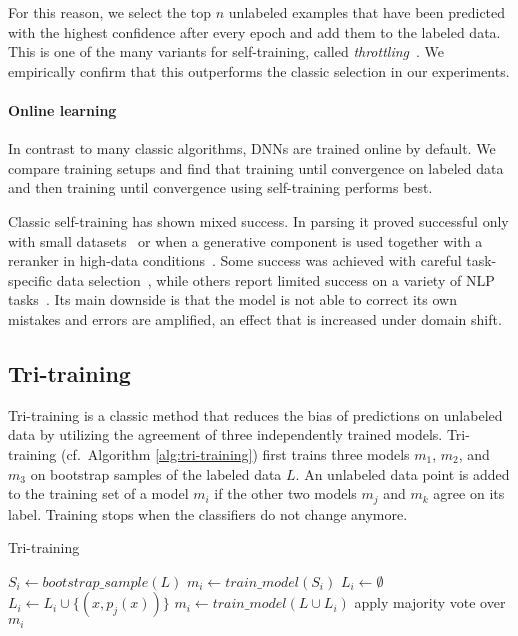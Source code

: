 \documentclass[11pt,a4paper]{article}
\begin{document}
For this reason, we select the top $n$ unlabeled examples that have been predicted with the highest confidence after every epoch and add them to the labeled data. This is one of the many variants for self-training, called \textit{throttling}~\cite{Abney2007}.
We empirically confirm that this outperforms the classic selection in our experiments.

\paragraph{Online learning} In contrast to many classic algorithms, DNNs are trained online by default. We compare training setups and find that training until convergence on labeled data and then training until convergence using self-training performs best.

Classic self-training has shown mixed success. In parsing it proved successful only with small datasets~\cite{reichart2007self} or when a generative component is used together with a reranker in high-data conditions~\cite{McClosky2006,suzuki2008semi}. Some success was achieved with careful task-specific data selection~\cite{Petrov2012}, while others report limited success on a variety of NLP tasks~\cite{
Plank2011,VanAsch2016,Vandergoot2017}. 
Its main downside is that the model is not able to correct its own mistakes and errors are amplified, an effect that is increased under domain shift.




\subsection{Tri-training}

Tri-training \cite{Zhou2005} is a classic method that reduces the bias of predictions on unlabeled data by utilizing the agreement of three independently trained models. Tri-training (cf.\ Algorithm \ref{alg:tri-training}) first trains three models $m_1$, $m_2$, and $m_3$ on bootstrap samples of the labeled data $L$. An unlabeled data point is added to the training set of a model $m_i$ if the other two models $m_j$ and $m_k$ agree on its label. Training stops when the classifiers do not change anymore. 

\begin{algorithm}
\caption{Tri-training \cite{Zhou2005}}\label{alg:tri-training}
\begin{algorithmic}[1]
\State $S_i \gets bootstrap\_sample(L)$
\State $m_i \gets train\_model(S_i)$
\EndFor
\Repeat
        \State $L_i \gets \emptyset$
            	\State $L_i \gets L_i \cup \{(x, p_j(x))\}$
            \EndIf
        \EndFor
        $m_i \gets train\_model(L \cup L_i)$
	\EndFor
{}
\State apply majority vote over $m_i$
\end{algorithmic}
\end{algorithm}
\end{document}
